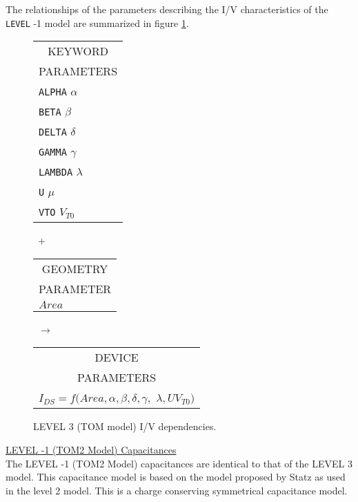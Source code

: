 \noindent
The relationships of the parameters describing the I/V
characteristics of the {\tt LEVEL} -1 model are summarized in figure
\ref{fig:blevel3i/v}.\\[0.1in]
\begin{figure}[h]
\begin{tabular}[t]{|p{1in}|}
\hline
\multicolumn{1}{|c|}{KEYWORD} \\
\multicolumn{1}{|c|}{PARAMETERS} \\
\hline
\hline
{\tt ALPHA} \hfill $\alpha$\\
{\tt BETA} \hfill $\beta$\\
{\tt DELTA} \hfill $\delta$\\
{\tt GAMMA} \hfill $\gamma$\\
{\tt LAMBDA} \hfill $\lambda$\\
{\tt U} \hfill $\mu$\\
{\tt VTO} \hfill $V_{T0}$\\
\hline
\end{tabular}
\hfill
\parbox{0.2in}{\ \vspace*{0.2in}\newline +}
\hfill
\begin{tabular}[t]{|p{1in}|}
\hline
\multicolumn{1}{|c|}{GEOMETRY} \\
\multicolumn{1}{|c|}{PARAMETER} \\
\hline
\hspace*{\fill}$Area$\\
\hline
\end{tabular}
\hfill
\parbox{0.2in}{\ \vspace*{0.2in}\newline $\rightarrow$}
\hfill
\begin{tabular}[t]{|p{1.8in}|}
\hline
\multicolumn{1}{|c|}{DEVICE} \\
\multicolumn{1}{|c|}{PARAMETERS} \\
\hline
$I_{DS} = f(Area, \alpha, \beta, \delta, \gamma,$\newline\hspace*{\fill}
$\lambda, U V_{T0})$\\
\hline
\end{tabular}
\caption{LEVEL 3 (TOM model) I/V dependencies. \label{fig:blevel3i/v}}
\end{figure}

\noindent\underline{\sc LEVEL -1 (TOM2 Model) Capacitances
 \label{blevel3cap.txt}}\\[0.1in]
 The {\sc LEVEL -1 } (TOM2 Model) capacitances are identical to that of the
 LEVEL 3 model. This capacitance model is based on the model proposed by
 Statz as used in the level 2 model.  This is a charge conserving
 symmetrical capacitance model.

